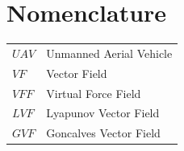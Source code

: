 \documentclass[conf]{new-aiaa}
\begin{document}
 

%
%
%
%




\section{Nomenclature}

{\renewcommand\arraystretch{1.0}
\noindent\begin{longtable*}{@{}l @{\quad=\quad} l@{}}
$UAV$  & Unmanned Aerial Vehicle \\
$VF$   & Vector Field \\
$VFF$  & Virtual Force Field \\
$LVF$  & Lyapunov Vector Field \\
$GVF$  & Goncalves Vector Field \\
\end{longtable*}}
\end{document}
